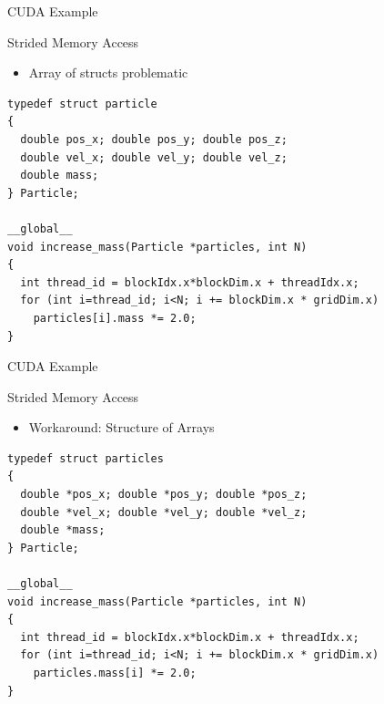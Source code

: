 
\begin{frame}[fragile]{CUDA Example}

\begin{block}{Strided Memory Access}
  \begin{itemize}
   \item Array of structs problematic
  \end{itemize}
  \begin{lstlisting}  
typedef struct particle
{
  double pos_x; double pos_y; double pos_z;
  double vel_x; double vel_y; double vel_z;
  double mass;
} Particle;
  
__global__ 
void increase_mass(Particle *particles, int N)
{
  int thread_id = blockIdx.x*blockDim.x + threadIdx.x;
  for (int i=thread_id; i<N; i += blockDim.x * gridDim.x)
    particles[i].mass *= 2.0;
}  
  \end{lstlisting}
\end{block}

\end{frame}


\begin{frame}[fragile]{CUDA Example}

\begin{block}{Strided Memory Access}
  \begin{itemize}
   \item Workaround: Structure of Arrays
  \end{itemize}
  \begin{lstlisting}  
typedef struct particles
{
  double *pos_x; double *pos_y; double *pos_z;
  double *vel_x; double *vel_y; double *vel_z;
  double *mass;
} Particle;
  
__global__ 
void increase_mass(Particle *particles, int N)
{
  int thread_id = blockIdx.x*blockDim.x + threadIdx.x;
  for (int i=thread_id; i<N; i += blockDim.x * gridDim.x)
    particles.mass[i] *= 2.0;
}  
  \end{lstlisting}
\end{block}

\end{frame}

